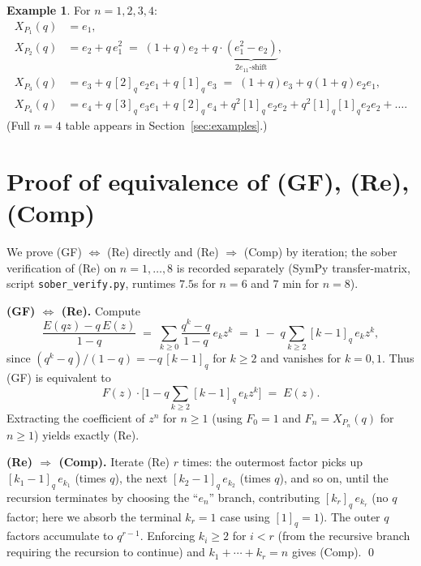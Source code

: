 \documentclass[11pt,a4paper]{amsart}
\theoremstyle{definition}
\newtheorem{example}[theorem]{Example}
\newcommand{\CQF}{X}
\newcommand{\Path}{P}
\newcommand{\qint}[1]{[#1]_q}
\begin{document}
\begin{example}\label{ex:small}
For $n = 1, 2, 3, 4$:
\begin{align*}
  \CQF_{\Path_1}(q) &= e_1,\\
  \CQF_{\Path_2}(q) &= e_2 + q\,e_1^2 \;=\; (1+q)e_2 + q\cdot\underbrace{(e_1^2 - e_2)}_{2e_{11}\text{-shift}},\\
  \CQF_{\Path_3}(q) &= e_3 + q\,\qint{2}\,e_2 e_1 + q\,\qint{1}\,e_3
                     \;=\; (1+q)e_3 + q(1+q)e_2 e_1,\\
  \CQF_{\Path_4}(q) &= e_4 + q\,\qint{3}\,e_3 e_1 + q\,\qint{2}\,e_4
                     + q^2 \qint{1}\,e_2 e_2 + q^2 \qint{1}\qint{1} e_2 e_2
                     + \ldots.
\end{align*}
(Full $n = 4$ table appears in Section~\ref{sec:examples}.)
\end{example}

\section{Proof of equivalence of (GF), (Re), (Comp)}\label{sec:proof}

We prove (GF) $\Leftrightarrow$ (Re) directly and (Re) $\Rightarrow$ (Comp)
by iteration; the sober verification of (Re) on $n = 1, \ldots, 8$ is
recorded separately (SymPy transfer-matrix, script
\texttt{sober\_verify.py}, runtimes $7.5$s for $n = 6$ and $7$ min for
$n = 8$).

\smallskip
\textbf{(GF) $\Leftrightarrow$ (Re).}
Compute
\[
  \frac{E(qz) - q\, E(z)}{1 - q}
  \;=\; \sum_{k \ge 0} \frac{q^k - q}{1 - q}\, e_k z^k
  \;=\; 1 \;-\; q\sum_{k \ge 2} \qint{k-1}\, e_k z^k,
\]
since $(q^k - q)/(1-q) = -q\,\qint{k-1}$ for $k \ge 2$ and vanishes for
$k = 0, 1$. Thus (GF) is equivalent to
\[
  F(z)\cdot \biggl[1 - q\sum_{k \ge 2}\qint{k-1}\, e_k z^k\biggr] \;=\; E(z).
\]
Extracting the coefficient of $z^n$ for $n \ge 1$ (using $F_0 = 1$ and
$F_n = \CQF_{\Path_n}(q)$ for $n \ge 1$) yields exactly (Re).

\smallskip
\textbf{(Re) $\Rightarrow$ (Comp).} Iterate (Re) $r$ times: the outermost
factor picks up $\qint{k_1 - 1}\, e_{k_1}$ (times $q$), the next
$\qint{k_2 - 1}\, e_{k_2}$ (times $q$), and so on, until the recursion
terminates by choosing the ``$e_n$'' branch, contributing
$\qint{k_r}\,e_{k_r}$ (no $q$ factor; here we absorb the terminal
$k_r = 1$ case using $\qint{1} = 1$). The outer $q$ factors accumulate
to $q^{r-1}$. Enforcing $k_i \ge 2$ for $i < r$ (from the recursive
branch requiring the recursion to continue) and $k_1 + \cdots + k_r = n$
gives (Comp). \qed
\end{document}
